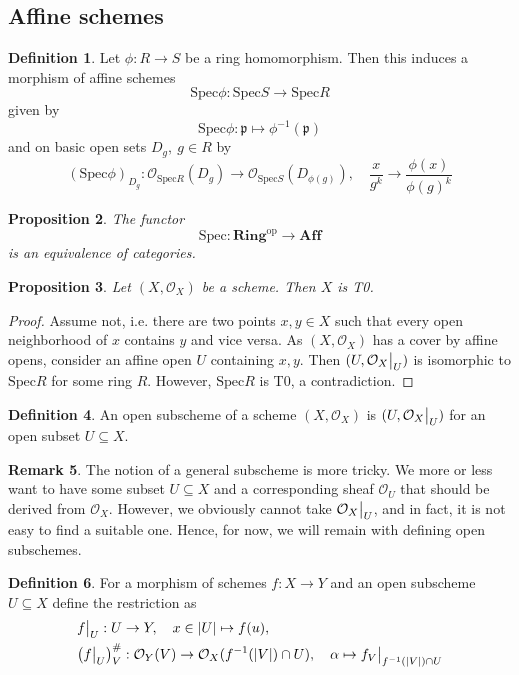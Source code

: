 \documentclass{scrartcl}
\newcommand{\p}{\mathfrak{p}}
\newcommand{\Aff}{\mathrm{\textbf{Aff}}}
\newcommand{\Ring}{\mathrm{\textbf{Ring}}}
\newcommand{\Spec}{\mathrm{Spec}}
\renewcommand{\O}{\mathcal{O}}
\newcommand\restr[2]{{
    \left.\kern-\nulldelimiterspace
    #1
    \vphantom{\big|}
    \right|_{#2}
}}
\newtheorem{prop}{Proposition}[section]
\theoremstyle{definition}
\newtheorem{definition}[prop]{Definition}
\newtheorem{remark}[prop]{Remark}
\begin{document}
\subsection{Affine schemes}
\begin{definition}
    Let $\phi: R \to S$ be a ring homomorphism.
    Then this induces a morphism of affine schemes
    \begin{equation*}
        \Spec\phi: \Spec S \to \Spec R
    \end{equation*}
    given by
    \begin{equation*}
        \Spec\phi: \p \mapsto \phi^{-1}(\p)
    \end{equation*}
    and on basic open sets $D_g, \ g \in R$ by
    \begin{equation*}
        (\Spec\phi)_{D_g}: \O_{\Spec R}(D_g) \to \O_{\Spec S}(D_{\phi(g)}), \quad \frac x {g^k} \to \frac {\phi(x)} {\phi(g)^k}
    \end{equation*}
\end{definition}
\begin{prop}
    The functor
    \begin{equation*}
        \Spec: \Ring^{\mathrm{op}} \to \Aff
    \end{equation*}
    is an equivalence of categories.
\end{prop}
\begin{prop}
    Let $(X, \O_X)$ be a scheme. Then $X$ is T0.
\end{prop}
\begin{proof}
    Assume not, i.e. there are two points $x, y \in X$ such that every open neighborhood of $x$ contains $y$ and vice versa.
    As $(X, \O_X)$ has a cover by affine opens, consider an affine open $U$ containing $x, y$.
    Then $(U, \restr{\O_X}{U})$ is isomorphic to $\Spec R$ for some ring $R$.
    However, $\Spec R$ is T0, a contradiction. 
\end{proof}
\begin{definition}
    An open subscheme of a scheme $(X, \O_X)$ is $(U, \restr{\O_X}{U})$ for an open subset $U \subseteq X$.
\end{definition}
\begin{remark}
    The notion of a general subscheme is more tricky.
    We more or less want to have some subset $U \subseteq X$ and a corresponding sheaf $\O_U$ that should be derived from $\O_X$.
    However, we obviously cannot take $\restr{\O_X}{U}$, and in fact, it is not easy to find a suitable one.
    Hence, for now, we will remain with defining open subschemes. 
\end{remark}
\begin{definition}
    For a morphism of schemes $f: X \to Y$ and an open subscheme $U \subseteq X$ define the restriction as
    \begin{align*}
        &\restr{f}{U}: U \to Y, \quad x \in |U| \mapsto f(u), \\
        &\bigl(\restr{f}{U}\bigr)^\#_V: \O_Y(V) \to \O_X(f^{-1}(|V|) \cap U), \quad \alpha \mapsto \restr{f_V}{f^{-1}(|V|) \cap U}
    \end{align*}
\end{definition}
\end{document}
